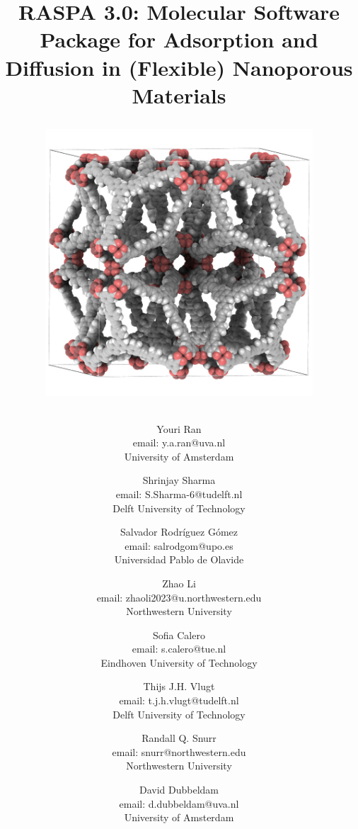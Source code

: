 \documentclass[onecolumn]{book}
\begin{document}
\title{
\vskip -3.0cm
RASPA 3.0: Molecular Software Package for Adsorption and Diffusion in (Flexible) Nanoporous Materials
\vskip 0.25cm
\begin{figure}[H]
\centering
\includegraphics[width=10cm]{nu-110.jpg}
\end{figure}}
\author{
Youri Ran\\{email: y.a.ran@uva.nl}\\University of Amsterdam
\and
Shrinjay Sharma\\{email: S.Sharma-6@tudelft.nl}\\Delft University of Technology
\and
Salvador Rodr\'iguez G\'omez\\{email: salrodgom@upo.es}\\Universidad Pablo de Olavide
\and
Zhao Li\\{email: zhaoli2023@u.northwestern.edu}\\Northwestern University
\and
Sofia Calero\\{email: s.calero@tue.nl}\\Eindhoven University of Technology
\and
Thijs J.H. Vlugt\\{email: t.j.h.vlugt@tudelft.nl}\\Delft University of Technology
\and
Randall Q. Snurr\\{email: snurr@northwestern.edu}\\Northwestern University
\and
David Dubbeldam\\{email: d.dubbeldam@uva.nl}\\University of Amsterdam
}

\maketitle

\tableofcontents


%

\end{document}
